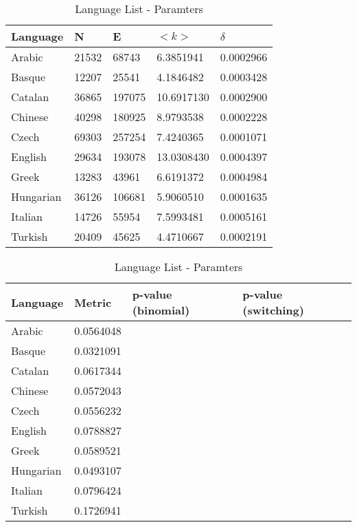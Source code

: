\documentclass[12pt, a4paper]{article}
\begin{document}
\begin{table}[H]
    \centering
    \begin{tabular}{l l l l l}
    Language & N & E & $<k>$ & $\delta$ \\
     \hline
    Arabic & 21532 & 68743 & 6.3851941 & 0.0002966 \\
    Basque & 12207 & 25541 & 4.1846482 & 0.0003428 \\
    Catalan & 36865 & 197075 & 10.6917130 & 0.0002900 \\
    Chinese & 40298 & 180925 & 8.9793538 & 0.0002228 \\
    Czech & 69303 & 257254 & 7.4240365 & 0.0001071 \\
    English & 29634 & 193078 & 13.0308430 & 0.0004397 \\
    Greek & 13283 & 43961 & 6.6191372 & 0.0004984 \\
    Hungarian & 36126 & 106681 & 5.9060510 & 0.0001635 \\
    Italian & 14726 & 55954 & 7.5993481 & 0.0005161 \\
    Turkish & 20409 & 45625 & 4.4710667 & 0.0002191 \\
    \end{tabular}
   \caption{Language List - Paramters}
   \label{table:1}
\end{table}

\begin{table}[H]
  \centering
  \begin{tabular}{l l l l}
  Language & Metric & p-value (binomial) & p-value (switching)\\
   \hline
   Arabic & 0.0564048  & & \\
   Basque & 0.0321091  & & \\
   Catalan & 0.0617344 & & \\
   Chinese & 0.0572043 & & \\
   Czech & 0.0556232 & & \\
   English & 0.0788827  & & \\
   Greek & 0.0589521  & & \\
   Hungarian & 0.0493107 & & \\
   Italian & 0.0796424 & & \\
   Turkish & 0.1726941  & & \\
     \end{tabular}
 \caption{Language List - Paramters}
 \label{table:1}
\end{table}

\end{document}

